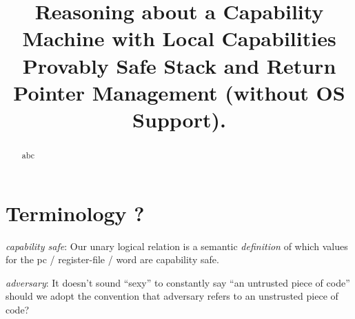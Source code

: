 \documentclass[compsoc,conference,letterpaper,fleqn]{IEEEtran}
\begin{document}
\setlength{\mathindent}{.2cm}

\title{Reasoning about a Capability Machine with Local Capabilities\\
 Provably Safe Stack and Return Pointer Management (without OS Support).}


\author{%
 \and
{}
   \and
{}}

\maketitle

\begin{abstract}
  abc
\end{abstract}

\section*{Terminology ?}

\emph{capability safe}: 
Our unary logical relation is a semantic \emph{definition}
of which values for the
pc / register-file / word are capability safe. 

\emph{adversary}: It doesn't sound ``sexy'' to constantly say ``an untrusted
piece of code'' should we adopt the convention that adversary refers
to an unstrusted piece of code?
\end{document}

